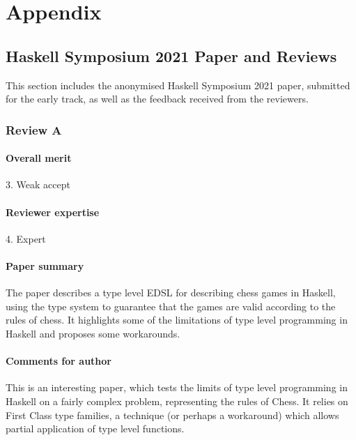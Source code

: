 \chapter*{Appendix}

\section*{Haskell Symposium 2021 Paper and Reviews} \label{symposiumfeedback}

This section includes the anonymised Haskell Symposium 2021 paper, submitted for the early track, as well as the feedback received from the reviewers.

\subsection*{Review A}

\subsubsection*{Overall merit}

3. Weak accept

\subsubsection*{Reviewer expertise}

4. Expert

\subsubsection*{Paper summary}

The paper describes a type level EDSL for describing chess games in Haskell, using the type system to guarantee that the games are valid according to the rules of chess. It highlights some of the limitations of type level programming in Haskell and proposes some workarounds.

\subsubsection*{Comments for author}

This is an interesting paper, which tests the limits of type level programming in Haskell on a fairly complex problem, representing the rules of Chess. It relies on First Class type families, a technique (or perhaps a workaround) which allows partial application of type level functions.

